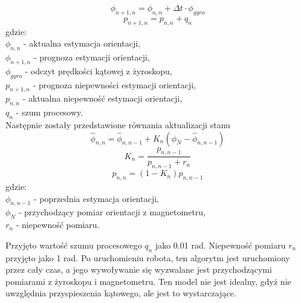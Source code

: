 {{        \begin{equation}
            \phi_{n+1,n}=\phi_{n,n}+\Delta t \cdot \phi_{gyro}
        \end{equation}
        \begin{equation}
            p_{n+1,n}=p_{n,n}+q_n
        \end{equation}
        gdzie:\\
        $\phi_{n,n}$ - aktualna estymacja orientacji,\\
        $\phi_{n+1,n}$ - prognoza estymacji orientacji,\\
        $\phi_{gyro}$ - odczyt prędkości kątowej z żyroskopu,\\
        $p_{n+1,n}$ - prognoza niepewności estymacji orientacji,\\
        $p_{n,n}$ - aktualna niepewność estymacji  orientacji,\\
        $q_n$ - szum procesowy.\\

        \newpage
        Następnie zostały przedstawione równania aktualizacji stanu
        \begin{equation}
            \hat{\phi}_{n,n}=\hat{\phi}_{n,n-1}+K_n(\phi_N - \hat{\phi}_{n,n-1})
        \end{equation}
        \begin{equation}
            K_n=\frac{p_{n,n-1}}{p_{n,n-1} + r_n}
        \end{equation}
        \begin{equation}
            p_{n,n}=(1-K_n)p_{n,n-1}
        \end{equation}
        gdzie:\\
        $\phi_{n,n-1}$ - poprzednia estymacja orientacji,\\
        $\phi_N$ - przychodzący pomiar orientacji z magnetometru,\\
        $r_n$ - niepewność pomiaru.

        Przyjęto wartość szumu procesowego $q_n$ jako 0.01 rad. Niepewność pomiaru $r_n$ przyjęto jako 1 rad. Po uruchomieniu robota, ten algorytm jest uruchomiony przez cały czas, a jego wywoływanie się wyzwalane jest przychodzącymi pomiarami z żyroskopu i magnetometru. Ten model nie jest idealny, gdyż nie uwzględnia przyspieszenia kątowego, ale jest to wystarczające.


        \newpage

}}
